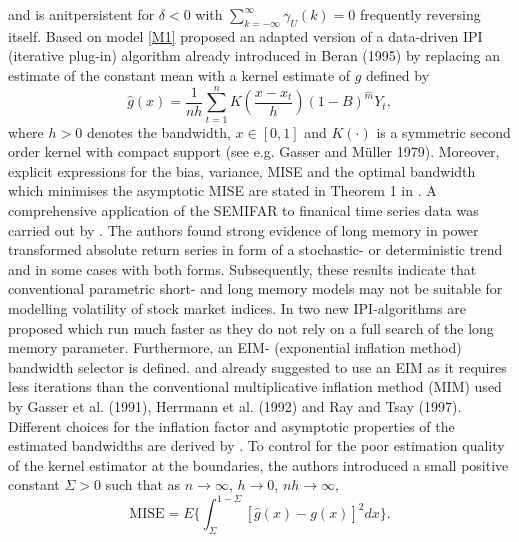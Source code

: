 \documentclass[12pt]{article}
\begin{document}
and is anitpersistent for \(\delta < 0\) with \( \sum_{k=-\infty}^{\infty} \gamma_{U}(k) = 0  \) frequently reversing itself. Based on model \eqref{M1} \citet{beran2002semifar} proposed an adapted version of a data-driven IPI (iterative plug-in) algorithm already introduced in Beran (1995) by replacing an estimate of the constant mean with a kernel estimate of $g$ defined by
\begin{equation}
\label{kern}
\hat{g}(x) = \frac{1}{nh}\sum_{t=1}^{n}K(\frac{x-x_t}{h})(1-B)^{\hat{m}}Y_t,
\end{equation}
where $h>0$ denotes the bandwidth, $x\in[0,1]$ and $K(\cdot)$ is a symmetric second order kernel with compact support (see e.g. Gasser and M\"uller 1979). Moreover, explicit expressions for the bias, variance, MISE and the optimal bandwidth which minimises the asymptotic MISE are stated in Theorem 1 in \citet{beran2002semifar}.
A comprehensive application of the SEMIFAR to finanical time series data was carried out by \citet{beran2001volatility}. The authors found strong evidence of long memory in power transformed absolute return series in form of a stochastic- or deterministic trend and in some cases with both forms. Subsequently, these results indicate that conventional parametric short- and long memory models may not be suitable for modelling volatility of stock market indices. In \citet{beran2002iterative} two new IPI-algorithms are proposed which run much faster as they do not rely on a full search of the long memory parameter. Furthermore, an EIM- (exponential inflation method) bandwidth selector is defined.  \citet{beran2001volatility} and \citet{beran2002semifar} already suggested to use an EIM as it requires less iterations than the conventional multiplicative inflation method (MIM) used by Gasser et al. (1991), Herrmann et al. (1992) and Ray and Tsay (1997). Different choices for the inflation factor and asymptotic properties of the estimated bandwidths are derived by \citet{beran2002iterative}. To control for the poor estimation quality of the kernel estimator at the boundaries, the authors introduced a small positive constant $\Sigma > 0$ such that as $n \rightarrow \infty$, $h\rightarrow 0$, $nh\rightarrow \infty$,
\begin{equation}
	\text{MISE} = E \bigg\{  \int_{\Sigma}^{1-\Sigma}[\hat{g}(x)-g(x)]^2dx   \bigg\}.
\end{equation}
\end{document}
